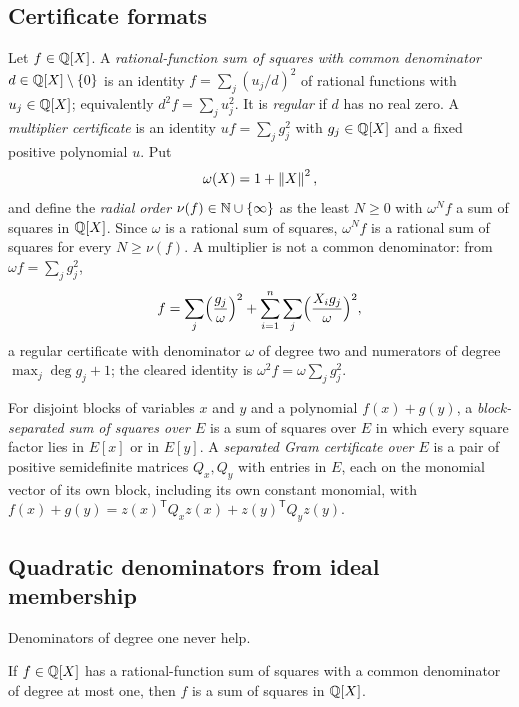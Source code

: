 \subsection{Certificate formats}
\label{sec:fields-formats}

Let $f\in\mathbb Q[X]$. A \emph{rational-function sum of squares with common
denominator} $d\in\mathbb Q[X]\setminus\{0\}$ is an identity
$f=\sum_j(u_j/d)^2$ of rational functions with $u_j\in\mathbb Q[X]$; equivalently
$d^2f=\sum_ju_j^2$. It is \emph{regular} if $d$ has no real zero. A
\emph{multiplier certificate} is an identity $uf=\sum_jg_j^2$ with
$g_j\in\mathbb Q[X]$ and a fixed positive polynomial $u$. Put
\[
 \omega(X)=1+\left\lVert X\right\rVert^2 ,
\]
and define the \emph{radial order} $\nu(f)\in\mathbb N\cup\{\infty\}$ as the least
$N\ge0$ with $\omega^Nf$ a sum of squares in $\mathbb Q[X]$. Since $\omega$ is a
rational sum of squares, $\omega^Nf$ is a rational sum of squares for every
$N\ge\nu(f)$. A multiplier is not a common denominator: from
$\omega f=\sum_jg_j^2$,
\begin{equation}
 f=\sum_j\Bigl(\frac{g_j}{\omega}\Bigr)^2
   +\sum_{i=1}^n\sum_j\Bigl(\frac{X_ig_j}{\omega}\Bigr)^2 ,
 \label{eq:fields-multiplier-to-denominator}
\end{equation}
a regular certificate with denominator $\omega$ of degree two and numerators
of degree $\max_j\deg g_j+1$; the cleared identity is
$\omega^2f=\omega\sum_jg_j^2$.

For disjoint blocks of variables $x$ and $y$ and a polynomial $f(x)+g(y)$, a
\emph{block-separated sum of squares over $E$} is a sum of squares over $E$
in which every square factor lies in $E[x]$ or in $E[y]$. A \emph{separated
Gram certificate over $E$} is a pair of positive semidefinite matrices
$Q_x,Q_y$ with entries in $E$, each on the monomial vector of its own block,
including its own constant monomial, with
$f(x)+g(y)=z(x)^{\mathsf T}Q_xz(x)+z(y)^{\mathsf T}Q_yz(y)$.

\subsection{Quadratic denominators from ideal membership}
\label{sec:fields-multipliers}

Denominators of degree one never help.

\begin{lemma}
\label{lem:fields-affine-denominator}
If $f\in\mathbb Q[X]$ has a rational-function sum of squares with a common
denominator of degree at most one, then $f$ is a sum of squares in $\mathbb Q[X]$.
\end{lemma}

